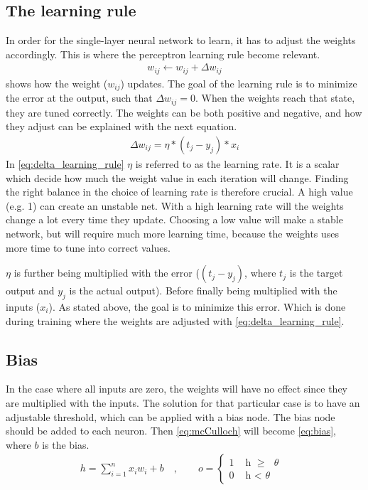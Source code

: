 \documentclass[USenglish]{ifimaster}  %
\begin{document}
\subsection{The learning rule}
In order for the single-layer neural network to learn, it has to adjust the weights accordingly. This is where the perceptron learning rule become relevant.
\begin{equation}\label{eq:learning_rule}
\begin{aligned}
w_{ij} \longleftarrow w_{ij} + \Delta w_{ij}
\end{aligned}
\end{equation}
 shows how the weight ($w_{ij}$) updates. The goal of the learning rule is to minimize the error at the output, such that $\Delta w_{ij} = 0 $. When the weights reach that state, they are tuned correctly. The weights can be both positive and negative, and how they adjust can be explained with the next equation. 
\begin{equation}\label{eq:delta_learning_rule}
\begin{aligned}
\Delta w_{ij} = \eta * (t_j - y_j) * x_i 
\end{aligned}
\end{equation}
In \cref{eq:delta_learning_rule} $\eta$ is referred to as the learning rate. It is a scalar which decide how much the weight value in each iteration will change. Finding the right balance in the choice of learning rate is therefore crucial. A high value (e.g. 1) can create an unstable net. With a high learning rate will the weights change a lot every time they update. %
Choosing a low value will make a stable network, but will require much more learning time, because the weights uses more time to tune into correct values.

$\eta$ is further being multiplied with the error ($(t_j - y_j)$, where $t_j$ is the target output and $y_j$ is the actual output). Before finally being multiplied with the inputs ($x_i$). As stated above, the goal is to minimize this error. Which is done during training where the weights are adjusted with \cref{eq:delta_learning_rule}.
\subsection{Bias}
In the case where all inputs are zero, the weights will have no effect since they are multiplied with the inputs. The solution for that particular case is to have an adjustable threshold, which can be applied with a bias node. The bias node should be added to each neuron. Then \cref{eq:mcCulloch} will become \cref{eq:bias}, where $b$ is the bias.
\begin{equation}\label{eq:bias}
\begin{aligned}
    {h = \sum_{i=1}^{n} x_i w_i + b \quad , \quad\quad o = 
\begin{cases}
    1 & \text{ h $\geq$ $\theta$ }  \\
    0 & \text{ h < $\theta$ }
\end{cases}}
\end{aligned}
\end{equation}
\end{document}
